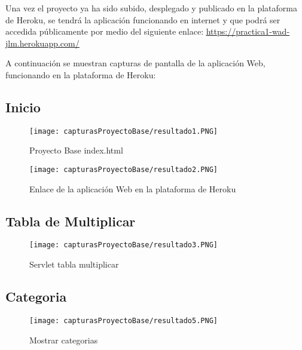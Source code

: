 \documentclass[titlepage, 12pt]{article}
\begin{document}
Una vez el proyecto ya ha sido subido, desplegado y publicado en la plataforma de Heroku, se tendrá la aplicación funcionando en internet y que podrá ser accedida públicamente por medio del siguiente enlace: \textcolor{blue}{\underline{\url{https://practica1-wad-jlm.herokuapp.com/}}}\par\vspace{0.5cm}

A continuación se muestran capturas de pantalla de la aplicación Web, funcionando en la plataforma de Heroku:

    \subsection{Inicio}

    \begin{figure}[h]
        \caption{Proyecto Base index.html}
        \centering
        \texttt{[image: capturasProyectoBase/resultado1.PNG]} \par \vspace{0.5cm}
    \end{figure}
    
    \begin{figure}[h]
        \caption{Enlace de la aplicación Web en la plataforma de Heroku}
        \centering
        \texttt{[image: capturasProyectoBase/resultado2.PNG]} \par\vspace{0.5cm}
    \end{figure}
    
    \clearpage
    \subsection{Tabla de Multiplicar}
    
    \begin{figure}[h]
        \caption{Servlet tabla multiplicar}
        \centering
        \texttt{[image: capturasProyectoBase/resultado3.PNG]} \par\vspace{0.5cm}
    \end{figure}
    
    \subsection{Categoria}
        
    \begin{figure}[h]
        \caption{Mostrar categorias}
        \centering
        \texttt{[image: capturasProyectoBase/resultado5.PNG]} \par\vspace{0.5cm}
    \end{figure}
    
\end{document}

